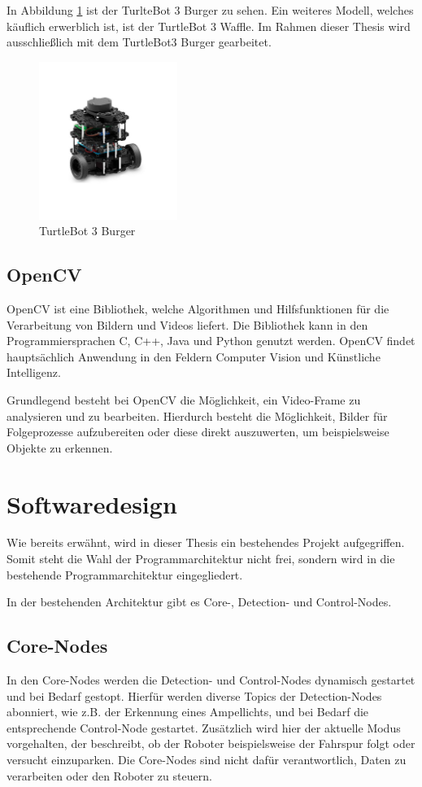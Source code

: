 In Abbildung \ref{fig:TurtleBot3_Burger} ist der TurlteBot 3 Burger zu sehen. Ein weiteres Modell, welches käuflich erwerblich ist, ist der TurtleBot 3 Waffle. Im Rahmen dieser Thesis
wird ausschließlich mit dem TurtleBot3 Burger gearbeitet.

\begin{figure}
  \centering
  \includegraphics[width=0.4\textwidth]{images/turtlebot-3.jpg}
  \caption{TurtleBot 3 Burger}
  \label{fig:TurtleBot3_Burger}
\end{figure}


\subsection{OpenCV}
OpenCV ist eine Bibliothek, welche Algorithmen und Hilfsfunktionen für die Verarbeitung von Bildern und Videos liefert. Die Bibliothek kann in den Programmiersprachen C, C++, Java und Python genutzt
werden. OpenCV findet hauptsächlich Anwendung in den Feldern Computer Vision und Künstliche Intelligenz.

Grundlegend besteht bei OpenCV die Möglichkeit, ein Video-Frame zu analysieren und zu bearbeiten. Hierdurch besteht die Möglichkeit, Bilder für Folgeprozesse aufzubereiten oder diese
direkt auszuwerten, um beispielsweise Objekte zu erkennen.

\section{Softwaredesign}
Wie bereits erwähnt, wird in dieser Thesis ein bestehendes Projekt aufgegriffen. Somit steht die Wahl der Programmarchitektur nicht frei, sondern wird in die bestehende
Programmarchitektur eingegliedert.

In der bestehenden Architektur gibt es Core-, Detection- und Control-Nodes.
\subsection{Core-Nodes}
In den Core-Nodes werden die Detection- und Control-Nodes dynamisch gestartet und bei Bedarf gestopt. Hierfür werden diverse Topics der Detection-Nodes abonniert, wie z.B. der Erkennung
eines Ampellichts, und bei Bedarf die entsprechende Control-Node gestartet. Zusätzlich wird hier der aktuelle Modus vorgehalten, der beschreibt, ob der Roboter beispielsweise der Fahrspur
folgt oder versucht einzuparken.
Die Core-Nodes sind nicht dafür verantwortlich, Daten zu verarbeiten oder den Roboter zu steuern.

